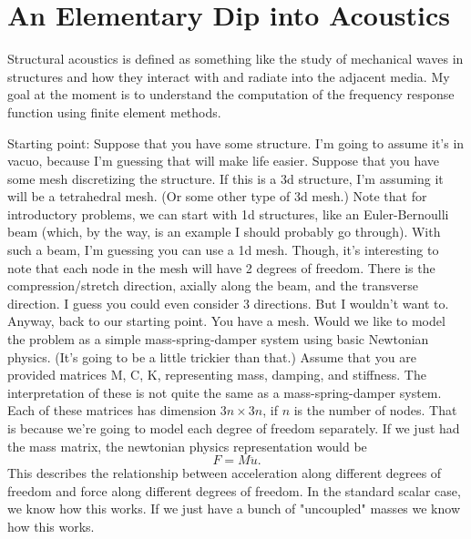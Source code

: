 

\section{An Elementary Dip into Acoustics}

Structural acoustics is defined as something like the study of mechanical waves in structures and how they interact with and radiate into the adjacent media. 
My goal at the moment is to understand the computation of the frequency response function using finite element methods. 

Starting point: Suppose that you have some structure. I'm going to assume it's in vacuo, because I'm guessing that will make life easier. Suppose that you have some mesh discretizing the structure. If this is a 3d structure, I'm assuming it will be a tetrahedral mesh. (Or some other type of 3d mesh.) Note that for introductory problems, we can start with 1d structures, like an Euler-Bernoulli beam (which, by the way, is an example I should probably go through). With such a beam, I'm guessing you can use a 1d mesh. Though, it's interesting to note that each node in the mesh will have 2 degrees of freedom. There is the compression/stretch direction, axially along the beam, and the transverse direction. I guess you could even consider 3 directions. But I wouldn't want to. Anyway, back to our starting point. You have a mesh. Would we like to model the problem as a simple mass-spring-damper system using basic Newtonian physics. (It's going to be a little trickier than that.) Assume that you are provided matrices M, C, K, representing mass, damping, and stiffness. The interpretation of these is not quite the same as a mass-spring-damper system. Each of these matrices has dimension $3n\times 3n$, if $n$ is the number of nodes. That is because we're going to model each degree of freedom separately. If we just had the mass matrix, the newtonian physics representation would be 
$$F = M\ddot u.$$ 
This describes the relationship between acceleration along different degrees of freedom and force along different degrees of freedom. In the standard scalar case, we know how this works. If we just have a bunch of "uncoupled" masses we know how this works. 

